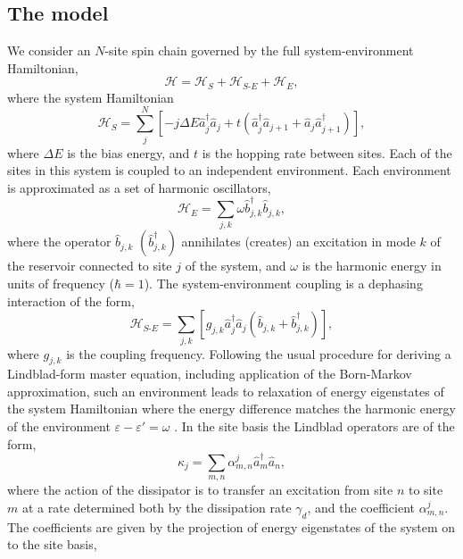 \subsection{The model}
We consider an \(N\)-site spin chain governed by the full system-environment Hamiltonian,
\begin{equation}
	\mathcal{H} = \mathcal{H}_{S} + \mathcal{H}_{S\text{-}E} + \mathcal{H}_{E},
	\label{eq:fw1-0}
\end{equation}
where the system Hamiltonian
\begin{equation}
	\mathcal{H}_{S} = \sum_{j}^{N}\left[ -j \Delta E \hat{a}_{j}^{\dagger}\hat{a}_{j} + t\left( \hat{a}_{j}^{\dagger}\hat{a}_{j+1} + \hat{a}_{j}\hat{a}_{j+1}^{\dagger}\right)\right],
	\label{eq:fw1-1}
\end{equation}
where \(\Delta E\) is the bias energy, and \(t\) is the hopping rate between sites. Each of the sites in this system is coupled to an independent environment. Each environment is approximated as a set of harmonic oscillators,
\begin{equation}
	\mathcal{H}_{E} = \sum_{j,k} \omega\hat{b}_{j,k}^{\dagger}\hat{b}_{j,k},
	\label{eq:fw1-3}
\end{equation}
where the operator \(\hat{b}_{j,k}\) \((\hat{b}_{j,k}^{\dagger})\) annihilates (creates) an excitation in mode \(k\) of the reservoir connected to site \(j\) of the system, and \(\omega\) is the harmonic energy in units of frequency (\(\hbar = 1\)). The system-environment coupling is a dephasing interaction of the form,
\begin{equation}
	\mathcal{H}_{S\text{-}E} = \sum_{j,k} \left[ g_{j,k}\hat{a}_{j}^{\dagger}\hat{a}_{j}\left( \hat{b}_{j,k} + \hat{b}_{j,k}^{\dagger} \right)\right],
	\label{eq:fw1-4}
\end{equation}
where \(g_{j,k}\) is the coupling frequency. Following the usual procedure for deriving a Lindblad-form master equation, including application of the Born-Markov approximation, such an environment leads to relaxation of energy eigenstates of the system Hamiltonian where the energy difference matches the harmonic energy of the environment \(\varepsilon - \varepsilon' = \omega\) \cite{Beaudoin2011}. In the site basis the Lindblad operators are of the form,
\begin{equation}
	\kappa_{j} = \sum_{m,n} \alpha_{m,n}^{j} \hat{a}_{m}^{\dagger}\hat{a}_{n},
	\label{eq:fw1-5}
\end{equation}
where the action of the dissipator is to transfer an excitation from site \(n\) to site \(m\) at a rate determined both by the dissipation rate \(\gamma_{d}\), and the coefficient \(\alpha_{m,n}^{j}\). The coefficients are given by the projection of energy eigenstates of the system on to the site basis,
